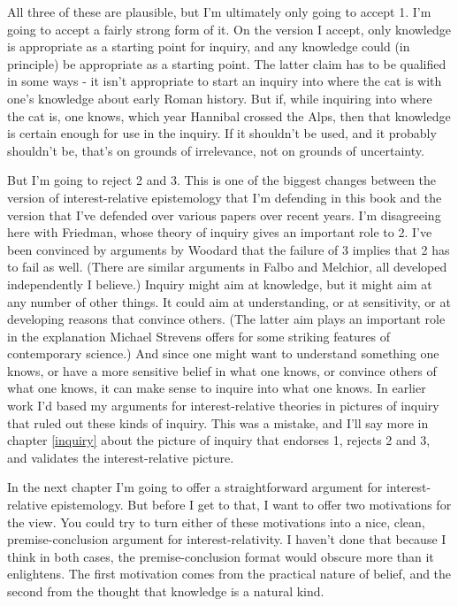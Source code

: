 \documentclass[
  11pt,
]{book}
\begin{document}
All three of these are plausible, but I'm ultimately only going to accept 1. I'm going to accept a fairly strong form of it. On the version I accept, only knowledge is appropriate as a starting point for inquiry, and any knowledge could (in principle) be appropriate as a starting point. The latter claim has to be qualified in some ways - it isn't appropriate to start an inquiry into where the cat is with one's knowledge about early Roman history. But if, while inquiring into where the cat is, one knows, which year Hannibal crossed the Alps, then that knowledge is certain enough for use in the inquiry. If it shouldn't be used, and it probably shouldn't be, that's on grounds of irrelevance, not on grounds of uncertainty.

But I'm going to reject 2 and 3. This is one of the biggest changes between the version of interest-relative epistemology that I'm defending in this book and the version that I've defended over various papers over recent years. I'm disagreeing here with Friedman, whose theory of inquiry gives an important role to 2. I've been convinced by arguments by Woodard that the failure of 3 implies that 2 has to fail as well. (There are similar arguments in Falbo and Melchior, all developed independently I believe.) Inquiry might aim at knowledge, but it might aim at any number of other things. It could aim at understanding, or at sensitivity, or at developing reasons that convince others. (The latter aim plays an important role in the explanation Michael Strevens \citeyearpar{Strevens2020} offers for some striking features of contemporary science.) And since one might want to understand something one knows, or have a more sensitive belief in what one knows, or convince others of what one knows, it can make sense to inquire into what one knows. In earlier work I'd based my arguments for interest-relative theories in pictures of inquiry that ruled out these kinds of inquiry. This was a mistake, and I'll say more in chapter \ref{inquiry} about the picture of inquiry that endorses 1, rejects 2 and 3, and validates the interest-relative picture.

In the next chapter I'm going to offer a straightforward argument for interest-relative epistemology. But before I get to that, I want to offer two motivations for the view. You could try to turn either of these motivations into a nice, clean, premise-conclusion argument for interest-relativity. I haven't done that because I think in both cases, the premise-conclusion format would obscure more than it enlightens. The first motivation comes from the practical nature of belief, and the second from the thought that knowledge is a natural kind.
\end{document}
